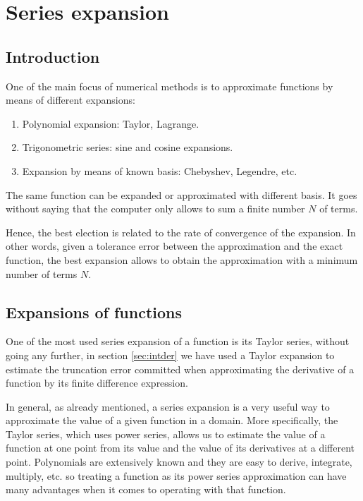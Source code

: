 \chapter{Series expansion} 



\section{Introduction} 

One of the main focus of numerical methods is to approximate functions by means of different expansions: 

\begin{enumerate} 
\setlength\itemsep{-0.1cm}
	\item Polynomial expansion: Taylor, Lagrange.
	\item Trigonometric series: sine and cosine expansions. 
	\item Expansion by means of known basis: Chebyshev, Legendre, etc. 
\end{enumerate} 

The same function can be expanded or approximated with different basis.
It goes without saying that the computer only allows to sum a finite number $ N $  of terms. 

Hence, the best election is related to the rate of convergence 
of the expansion. In other words, given a tolerance error between the approximation and the exact function, 
the best expansion allows to obtain the approximation with a minimum number of terms $N$. 




\newpage
\section{Expansions of functions} 
   
One of the most used series expansion of a function is its Taylor series, without going any further, in section \ref{sec:intder} we have used a Taylor expansion to estimate the truncation error committed when approximating the derivative of a function by its finite difference expression.

In general, as already mentioned, a series expansion is a very useful way to approximate the value of a given function in a domain. More specifically, the Taylor series, which uses power series, allows us to estimate the value of a function at one point from its value and the value of its derivatives at a different point. Polynomials are extensively known and they are easy to derive, integrate, multiply, etc. so treating a function as its power series approximation can have many advantages when it comes to operating with that function.

